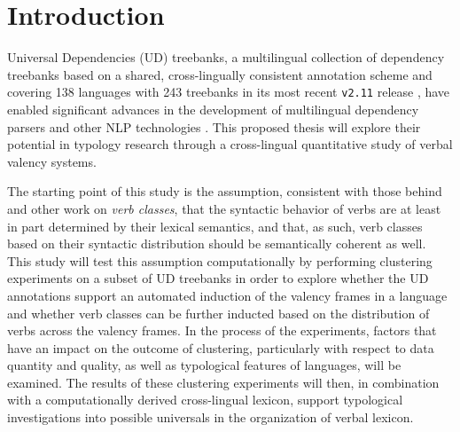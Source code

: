 \chapter{Introduction}

Universal Dependencies (UD) treebanks, a multilingual collection of dependency treebanks based on a shared, cross-lingually consistent annotation scheme \citep{nivre2020} and covering 138 languages with 243 treebanks in its most recent \texttt{v2.11} release \citep{universaldep}, have enabled significant advances in the development of multilingual dependency parsers and other NLP technologies \citep{zeman2017, zeman2018}. This proposed thesis will explore their potential in typology research through a cross-lingual quantitative study of verbal valency systems.

The starting point of this study is the assumption, consistent with those behind \citet{levin1993} and other work on \textit{verb classes}, that the syntactic behavior of verbs are at least in part determined by their lexical semantics, and that, as such, verb classes based on their syntactic distribution should be semantically coherent as well. This study will test this assumption computationally by performing clustering experiments on a subset of UD treebanks in order to explore whether the UD annotations support an automated induction of the valency frames in a language and whether verb classes can be further inducted based on the distribution of verbs across the valency frames. In the process of the experiments, factors that have an impact on the outcome of clustering, particularly with respect to data quantity and quality, as well as typological features of languages, will be examined. The results of these clustering experiments will then, in combination with a computationally derived cross-lingual lexicon, support typological investigations into possible universals in the organization of verbal lexicon.